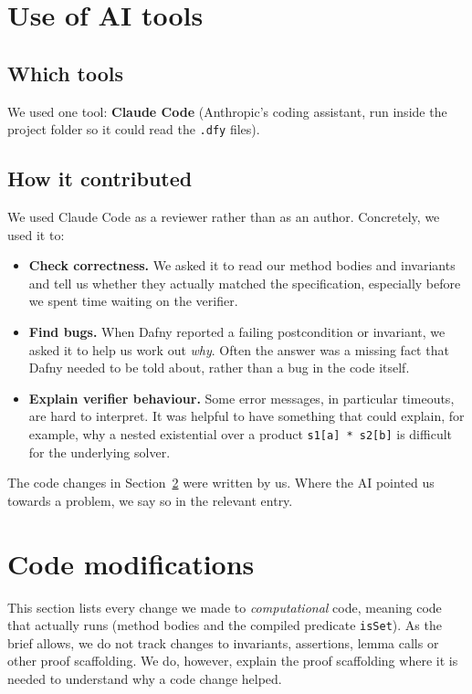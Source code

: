 \documentclass[11pt,a4paper]{article}
\begin{document}
\section{Use of AI tools}

\subsection{Which tools}

We used one tool: \textbf{Claude Code} (Anthropic's coding assistant, run inside the project folder so it could read the \texttt{.dfy} files).

\subsection{How it contributed}

We used Claude Code as a reviewer rather than as an author. Concretely, we used it to:

\begin{itemize}
  \item \textbf{Check correctness.} We asked it to read our method bodies and invariants and tell us whether they actually matched the specification, especially before we spent time waiting on the verifier.
  \item \textbf{Find bugs.} When Dafny reported a failing postcondition or invariant, we asked it to help us work out \emph{why}. Often the answer was a missing fact that Dafny needed to be told about, rather than a bug in the code itself.
  \item \textbf{Explain verifier behaviour.} Some error messages, in particular timeouts, are hard to interpret. It was helpful to have something that could explain, for example, why a nested existential over a product \texttt{s1[a] * s2[b]} is difficult for the underlying solver.
\end{itemize}

The code changes in Section~\ref{sec:changes} were written by us. Where the AI pointed us towards a problem, we say so in the relevant entry.

\section{Code modifications}
\label{sec:changes}

This section lists every change we made to \emph{computational} code, meaning code that actually runs (method bodies and the compiled predicate \texttt{isSet}). As the brief allows, we do not track changes to invariants, assertions, lemma calls or other proof scaffolding. We do, however, explain the proof scaffolding where it is needed to understand why a code change helped.
\end{document}
